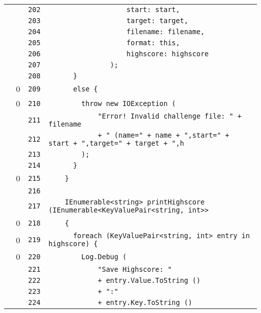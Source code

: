 \documentclass[a4paper,10pt]{article}
\begin{document}
\begin{longtable}[l]{lrrl}
\cellcolor{gray} &  & \verb~202~ & \verb~                   start: start,~\\
\cellcolor{gray} &  & \verb~203~ & \verb~                   target: target,~\\
\cellcolor{gray} &  & \verb~204~ & \verb~                   filename: filename,~\\
\cellcolor{gray} &  & \verb~205~ & \verb~                   format: this,~\\
\cellcolor{gray} &  & \verb~206~ & \verb~                   highscore: highscore~\\
\cellcolor{gray} &  & \verb~207~ & \verb~               );~\\
\cellcolor{gray} &  & \verb~208~ & \verb~      }~\\
\cellcolor{red} & 0 & \verb~209~ & \verb~      else {~\\
\cellcolor{red} & 0 & \verb~210~ & \verb~        throw new IOException (~\\
\cellcolor{gray} &  & \verb~211~ & \verb~            "Error! Invalid challenge file: " + filename~\\
\cellcolor{gray} &  & \verb~212~ & \verb~            + " (name=" + name + ",start=" + start + ",target=" + target + ",h~\\
\cellcolor{gray} &  & \verb~213~ & \verb~        );~\\
\cellcolor{gray} &  & \verb~214~ & \verb~      }~\\
\cellcolor{red} & 0 & \verb~215~ & \verb~    }~\\
\cellcolor{gray} &  & \verb~216~ & \verb~~\\
\cellcolor{gray} &  & \verb~217~ & \verb~    IEnumerable<string> printHighscore (IEnumerable<KeyValuePair<string, int>>~\\
\cellcolor{red} & 0 & \verb~218~ & \verb~    {~\\
\cellcolor{red} & 0 & \verb~219~ & \verb~      foreach (KeyValuePair<string, int> entry in highscore) {~\\
\cellcolor{red} & 0 & \verb~220~ & \verb~        Log.Debug (~\\
\cellcolor{gray} &  & \verb~221~ & \verb~            "Save Highscore: "~\\
\cellcolor{gray} &  & \verb~222~ & \verb~            + entry.Value.ToString ()~\\
\cellcolor{gray} &  & \verb~223~ & \verb~            + ":"~\\
\cellcolor{gray} &  & \verb~224~ & \verb~            + entry.Key.ToString ()~\\

\end{longtable}
\end{document}
